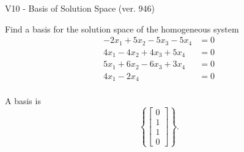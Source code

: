 \begin{exercise}
  \begin{exerciseTitle}V10 - Basis of Solution Space (ver. 946)\end{exerciseTitle}
  \begin{exerciseStatement}
    Find a basis for the solution space of the homogeneous system 
\begin{align*}
 -2 x_ 1 + 5 x_ 2 -5 x_ 3 -5 x_ 4 &= 0  \\ 
  4 x_ 1 -4 x_ 2 + 4 x_ 3 + 5 x_ 4 &= 0  \\ 
  5 x_ 1 + 6 x_ 2 -6 x_ 3 + 3 x_ 4 &= 0  \\ 
  4 x_ 1 -2 x_ 4 &= 0  \\ 
 \end{align*}


 
  \end{exerciseStatement}

  \begin{exerciseAnswer}
   A basis is   
\[\left\{\left[\begin{array}{c}
0 \\
1 \\
1 \\
0
\end{array}\right]\right\}.\]

  


  \end{exerciseAnswer}
\end{exercise}